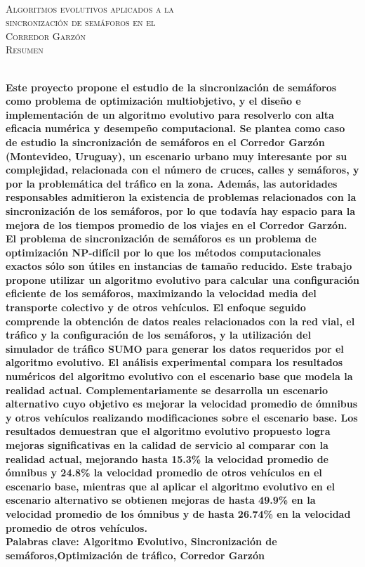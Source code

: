 {
\thispagestyle{empty}
~\\[0.1cm]
\begin{center}
    \textsc{\huge Algoritmos evolutivos aplicados a la  } \\[0.2cm] 
    \textsc{\huge sincronización de semáforos en el  } \\[0.2cm]         
    \textsc{\huge Corredor Garzón} \\[0.5cm]
    \textsc{\Large Resumen}
\end{center}
~\\[0.1cm]
\textbf{\large 
Este proyecto propone el estudio de la sincronización de semáforos como problema de optimización multiobjetivo, y el diseño e implementación de un algoritmo evolutivo para resolverlo con alta eficacia numérica y desempeño computacional. Se plantea como caso de estudio la sincronización de semáforos en el Corredor Garzón (Montevideo, Uruguay), un escenario urbano muy interesante por su complejidad, relacionada con el número de cruces, calles y semáforos, y por la problemática del tráfico en la zona. Además, las autoridades responsables admitieron la existencia de problemas relacionados con la sincronización de los semáforos, por lo que todavía hay espacio para la mejora de los tiempos promedio de los viajes en el Corredor Garzón.  \newline \newline
El problema de sincronización de semáforos es un problema de optimización NP-difícil por lo que los métodos computacionales exactos sólo son útiles en instancias de tamaño reducido. Este trabajo propone utilizar un algoritmo evolutivo para calcular una configuración eficiente de los semáforos, maximizando la velocidad media del transporte colectivo y de otros vehículos. El enfoque seguido comprende la obtención de datos reales relacionados con la red vial, el tráfico y la configuración de los semáforos, y la utilización del simulador de tráfico SUMO para generar los datos requeridos por el algoritmo evolutivo.
\newline \newline
El análisis experimental compara los resultados numéricos del algoritmo evolutivo con el escenario base que modela la realidad actual. Complementariamente se desarrolla un escenario alternativo cuyo objetivo es mejorar la velocidad promedio de ómnibus y otros vehículos realizando modificaciones sobre el escenario base. Los resultados demuestran que el algoritmo evolutivo propuesto logra mejoras significativas en la calidad de servicio al comparar con la realidad actual, mejorando hasta 15.3\% la velocidad promedio de ómnibus y 24.8\% la velocidad promedio de otros vehículos en el escenario base, mientras que al aplicar el algoritmo evolutivo en el escenario alternativo se obtienen mejoras de hasta 49.9\% en la velocidad promedio de los ómnibus y de hasta 26.74\% en la velocidad promedio de otros vehículos.
 } 	
	~\\[0.5cm]
    \textbf{\large Palabras clave: Algoritmo Evolutivo, Sincronización de semáforos,\newline Optimización de tráfico, Corredor Garzón}

}
\cleardoublepage
